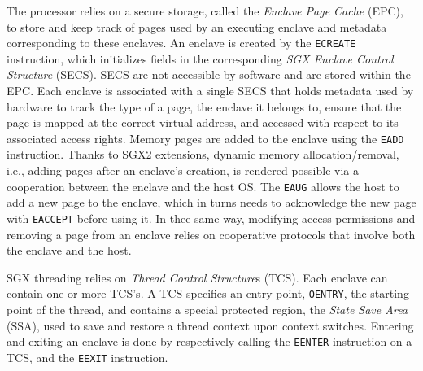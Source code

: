 The processor relies on a secure storage, called the \emph{Enclave Page Cache} (EPC), to store and keep track of pages used by an executing enclave and metadata corresponding to these enclaves.
An enclave is created by the \lstinline{ECREATE} instruction, which initializes fields in the corresponding \emph{SGX Enclave Control Structure} (SECS).
SECS are not accessible by software and are stored within the EPC.
Each enclave is associated with a single SECS that holds metadata used by hardware to track the type of a page, the enclave it belongs to, ensure that the page is mapped at the correct virtual address, and accessed with respect to its associated access rights.
Memory pages are added to the enclave using the \lstinline{EADD} instruction.
Thanks to SGX2 extensions, dynamic memory allocation/removal, i.e., adding pages after an enclave's creation, is rendered possible via a cooperation between the enclave and the host OS.
The \lstinline{EAUG} allows the host to add a new page to the enclave, which in turns needs to acknowledge the new page with \lstinline{EACCEPT} before using it.
In thee same way, modifying access permissions and removing a page from an enclave relies on cooperative protocols that involve both the enclave and the host.

SGX threading relies on \emph{Thread Control Structure}s (TCS).
Each enclave can contain one or more TCS's.
A TCS specifies an entry point, \lstinline{OENTRY}, the starting point of the thread, and contains a special protected region, the \emph{State Save Area} (SSA), used to save and restore a thread context upon context switches.
Entering and exiting an enclave is done by respectively calling the \lstinline{EENTER} instruction on a TCS, and the \lstinline{EEXIT} instruction.

